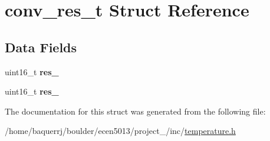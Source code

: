 \hypertarget{structconv__res__t}{}\section{conv\+\_\+res\+\_\+t Struct Reference}
\label{structconv__res__t}
\subsection*{Data Fields}
\begin{DoxyCompactItemize}
\item 
\mbox{\label{structconv__res__t_a1725a380082c12eb34e95088e03dc3c5}} 
uint16\+\_\+t {\bfseries res\+\_}
\item 
\mbox{\label{structconv__res__t_a9fbfcd989c88a2d8f55444148d97208d}} 
uint16\+\_\+t {\bfseries res\+\_}
\end{DoxyCompactItemize}


The documentation for this struct was generated from the following file\+:\begin{DoxyCompactItemize}
\item 
/home/baquerrj/boulder/ecen5013/project\+\_/inc/\hyperlink{temperature_8h}{temperature.\+h}\end{DoxyCompactItemize}
